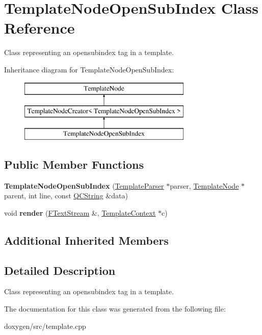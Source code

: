 \hypertarget{class_template_node_open_sub_index}{}\section{Template\+Node\+Open\+Sub\+Index Class Reference}
\label{class_template_node_open_sub_index}


Class representing an \textquotesingle{}opensubindex\textquotesingle{} tag in a template.  


Inheritance diagram for Template\+Node\+Open\+Sub\+Index\+:\begin{figure}[H]
\begin{center}
\leavevmode
\includegraphics[height=3.000000cm]{class_template_node_open_sub_index}
\end{center}
\end{figure}
\subsection*{Public Member Functions}
\begin{DoxyCompactItemize}
\item 
\mbox{\label{class_template_node_open_sub_index_a1a226b93fca44d7063485add66364b0b}} 
{\bfseries Template\+Node\+Open\+Sub\+Index} (\mbox{\hyperlink{class_template_parser}{Template\+Parser}} $\ast$parser, \mbox{\hyperlink{class_template_node}{Template\+Node}} $\ast$parent, int line, const \mbox{\hyperlink{class_q_c_string}{Q\+C\+String}} \&data)
\item 
\mbox{\label{class_template_node_open_sub_index_aa6b5d454dc4f96d2a21ce04b54ea0ce4}} 
void {\bfseries render} (\mbox{\hyperlink{class_f_text_stream}{F\+Text\+Stream}} \&, \mbox{\hyperlink{class_template_context}{Template\+Context}} $\ast$c)
\end{DoxyCompactItemize}
\subsection*{Additional Inherited Members}


\subsection{Detailed Description}
Class representing an \textquotesingle{}opensubindex\textquotesingle{} tag in a template. 

The documentation for this class was generated from the following file\+:\begin{DoxyCompactItemize}
\item 
doxygen/src/template.\+cpp\end{DoxyCompactItemize}
